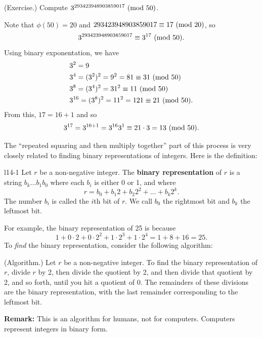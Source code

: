 \documentclass[letterpaper]{article}
\begin{document}
\begin{mdframed}
    (Exercise.) Compute $3^{293423948903859017} \ (\mathrm{mod}\ 50)$. 

    \begin{mdframed}
        Note that $\phi(50) = 20$ and $293423948903859017 \equiv 17 \ (\mathrm{mod}\ 20)$, so 
        \[3^{293423948903859017} \equiv 3^{17} \ (\mathrm{mod}\ 50).\]
        Using binary exponentation, we have 
        \begin{equation*}
            \begin{aligned}
                &3^2 = 9 \\ 
                &3^4 = (3^2)^2 = 9^2 = 81 \equiv 31 \ (\mathrm{mod}\ 50) \\ 
                &3^8 = (3^4)^2 = 31^2 \equiv 11 \ (\mathrm{mod}\ 50) \\ 
                &3^{16} = (3^8)^2 = 11^2 = 121 \equiv 21 \ (\mathrm{mod}\ 50).
            \end{aligned}
        \end{equation*}
        From this, $17 = 16 + 1$ and so \[3^{17} = 3^{16 + 1} = 3^{16} 3^1 \equiv 21 \cdot 3 = 13 \ (\mathrm{mod}\ 50).\]
    \end{mdframed}
\end{mdframed}

The ``repeated squaring and then multiply together'' part of this process is very closely related to finding binary representations of integers. Here is the definition: 
\begin{definition}{}{l14-1}
    Let $r$ be a non-negative integer. The \textbf{binary representation} of $r$ is a string $b_{k} \hdots b_{1}b_{0}$ where each $b_i$ is either 0 or 1, and where 
    \[r = b_0 + b_1 2 + b_2 2^2 + \hdots + b_k 2^k.\]
    The number $b_i$ is called the $i$th bit of $r$. We call $b_0$ the rightmost bit and $b_k$ the leftmost bit. 
\end{definition}
For example, the binary representation of 25 is  because \[1 + 0 \cdot 2 + 0 \cdot 2^2 + 1 \cdot 2^3 + 1 \cdot 2^4 = 1 + 8 + 16 = 25.\] To \emph{find} the binary representation, consider the following algorithm: 
\begin{mdframed}
    (Algorithm.) Let $r$ be a non-negative integer. To find the binary representation of $r$, divide $r$ by 2, then divide the quotient by 2, and then divide that quotient by 2, and so forth, until you hit a quotient of 0. The remainders of these divisions are the binary representation, with the last remainder corresponding to the leftmost bit. 
\end{mdframed}
\textbf{Remark:} This is an algorithm for humans, not for computers. Computers represent integers in binary form. 
\end{document}
